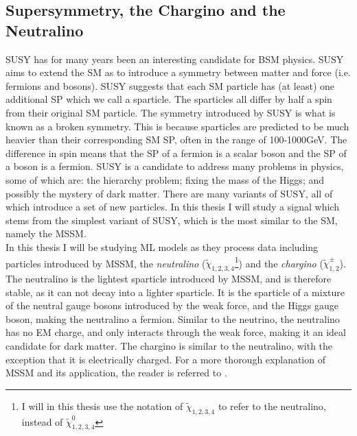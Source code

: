 \subsection{Supersymmetry, the Chargino and the Neutralino}\label{subsec:SS}
\acf{SUSY} has for many years been an interesting candidate for \ac{BSM} physics. 
\ac{SUSY} aims to extend the \ac{SM} as to introduce a symmetry between matter and force (i.e. fermions and bosons). 
\ac{SUSY} suggests that each \ac{SM} particle has (at least) one additional \ac{SP} which we call a sparticle. 
The sparticles all differ by half a spin from their original \ac{SM} particle. The symmetry introduced by \ac{SUSY} is what 
is known as a broken symmetry. This is because sparticles are predicted to be much heavier than their corresponding \ac{SM} \ac{SP}, 
often in the range of 100-1000GeV. The difference in spin means that the \ac{SP} of a fermion is a scalar boson and the \ac{SP} 
of a boson is a fermion. \ac{SUSY} is a candidate to address many problems in physics, some of which are: the hierarchy problem; fixing 
the mass of the Higgs; and possibly the mystery of dark matter. There are many variants of \ac{SUSY}, all of which introduce a set 
of new particles. In this thesis I will study a signal which stems from the simplest variant of \ac{SUSY}, which is the most 
similar to the \ac{SM}, namely the \ac{MSSM}. 
\\
In this thesis I will be studying \ac{ML} models as they process data including particles introduced by \ac{MSSM}, the \emph{neutralino} ($\tilde{\chi}_{1,2,3,4}$\footnote{I will in this thesis 
use the notation of $\tilde{\chi}_{1,2,3,4}$ to refer to the neutralino, instead of $\tilde{\chi}^0_{1,2,3,4}$}) and 
the \emph{chargino} ($\tilde{\chi}^{\pm}_{1,2}$). The neutralino is the lightest sparticle introduced by \ac{MSSM}, and is therefore stable, as it can not decay into a lighter sparticle. 
It is the sparticle of a mixture of the neutral gauge bosons introduced by the weak force, and the Higgs gauge boson, making the neutralino a 
fermion. Similar to the neutrino, the neutralino has no \ac{EM} charge, and only interacts through the weak force, making it an ideal candidate 
for dark matter. The chargino is similar to the neutralino, with the exception that it is electrically charged. 
For a more thorough explanation of \ac{MSSM} and its application, the reader is referred to \cite{SUSY}. 